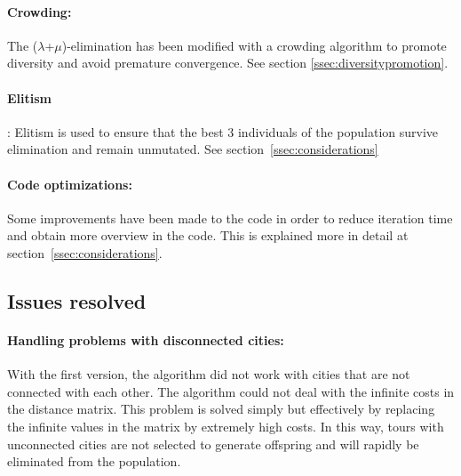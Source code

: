 \documentclass[a4paper,10pt]{article}
\newcommand{\ReplaceMe}[1]{{\color{blue}#1}}
\begin{document}
\paragraph{Crowding:} The ($\lambda$+$\mu$)-elimination has been modified with a crowding algorithm to promote diversity and avoid premature convergence. See section \ref{ssec:diversitypromotion}.
\paragraph{Elitism}: Elitism is used to ensure that the best 3 individuals of the population survive elimination and remain unmutated. See section~\ref{ssec:considerations}
\paragraph{Code optimizations:} Some improvements have been made to the code in order to reduce iteration time and obtain more overview in the code. This is explained more in detail at section~\ref{ssec:considerations}.


\subsection{Issues resolved}\label{sec:resolved}

\paragraph{Handling problems with disconnected cities:} With the first version, the algorithm did not work with cities that are not connected with each other. The algorithm could not deal with the infinite costs in the distance matrix. This problem is solved simply but effectively by replacing the infinite values in the matrix by extremely high costs. In this way, tours with unconnected cities are not selected to generate offspring and will rapidly be eliminated from the population.
\end{document}

